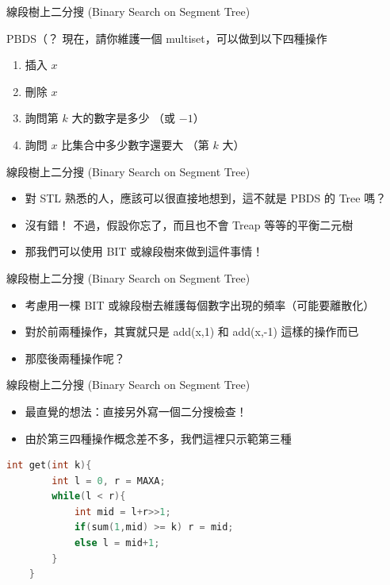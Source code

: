 \documentclass[aspectratio=169]{beamer}
\begin{document}
    \begin{frame}{線段樹上二分搜 (Binary Search on Segment Tree)}
        \begin{block}{PBDS（？}
            現在，請你維護一個 multiset，可以做到以下四種操作
            \begin{enumerate}
                \item 插入 $x$
                \item 刪除 $x$
                \item 詢問第 $k$ 大的數字是多少 （或 $-1$）
                \item 詢問 $x$ 比集合中多少數字還要大 （第 $k$ 大）
            \end{enumerate}
        \end{block}
    \end{frame}

    \begin{frame}{線段樹上二分搜 (Binary Search on Segment Tree)}
        \begin{itemize}
            \item 對 STL 熟悉的人，應該可以很直接地想到，這不就是 PBDS 的 Tree 嗎？
            \item<2-> 沒有錯！ 不過，假設你忘了，而且也不會 Treap 等等的平衡二元樹
            \item<3-> 那我們可以使用 BIT 或線段樹來做到這件事情！
        \end{itemize}
    \end{frame}

    \begin{frame}{線段樹上二分搜 (Binary Search on Segment Tree)}
        \begin{itemize}
            \item 考慮用一棵 BIT 或線段樹去維護每個數字出現的頻率（可能要離散化）
            \item 對於前兩種操作，其實就只是 add(x,1) 和 add(x,-1) 這樣的操作而已
            \item 那麼後兩種操作呢？
        \end{itemize}
    \end{frame}

    \begin{frame}[fragile]{線段樹上二分搜 (Binary Search on Segment Tree)}
        \begin{itemize}
            \item 最直覺的想法：直接另外寫一個二分搜檢查！
            \item 由於第三四種操作概念差不多，我們這裡只示範第三種
        \end{itemize}
        \begin{lstlisting}[language=C++, basicstyle=\ttfamily\small]
    int get(int k){
        int l = 0, r = MAXA;
        while(l < r){
            int mid = l+r>>1;
            if(sum(1,mid) >= k) r = mid;
            else l = mid+1;
        }
    }
        \end{lstlisting}
    \end{frame}
\end{document}
